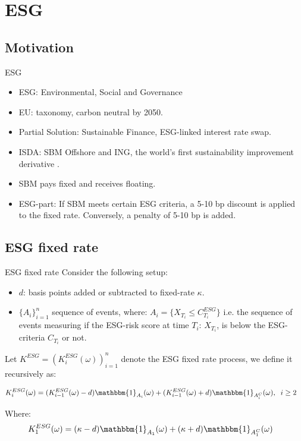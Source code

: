 \documentclass[UKenglish]{beamer}
\begin{document}
\section{ESG}
\SectionPage

\subsection{Motivation}
\begin{frame}{ESG}
\begin{itemize}
    \item ESG: Environmental, Social and Governance
    \item EU: taxonomy, carbon neutral by 2050.  
    \item Partial Solution: Sustainable Finance,
          ESG-linked interest rate swap. 
    \item ISDA: SBM Offshore and ING, the world's first sustainability improvement derivative
    \cite{ISDA_2021}. 
    \item SBM pays fixed and receives floating. 
    \item ESG-part: If SBM meets certain ESG criteria, a 5-10 bp discount is applied to the fixed rate. Conversely, a penalty of 5-10 bp is added.  
\end{itemize}
\end{frame}


\subsection{ESG fixed rate}

\begin{frame}{ESG fixed rate}
Consider the following setup: 
\begin{itemize}
    \item $d$: basis points added or subtracted to fixed-rate $\kappa$. 
    \item $\{A_{i}\}_{i=1}^{n}$ sequence of events, where: 
    $A_{i} = \{X_{T_{i}} \leq C_{T_{i}}^{ESG}\}$
    i.e. the sequence of events measuring if the ESG-risk score at time $T_{i}$: $X_{T_{i}}$, is below the ESG-criteria $C_{T_{i}}$ or not. 
\end{itemize}

\begin{definition}
Let $K^{ESG} = (K_{i}^{ESG}(\omega))_{i=1}^{n}$ 
denote the ESG fixed rate process, we define it recursively as: 

\begin{align*}
K_{i}^{ESG}(\omega) &= (K_{i-1}^{ESG}(\omega)-d)\mathbbm{1}_{A_{i}}(\omega)
+ (K_{i-1}^{ESG}(\omega)+d)\mathbbm{1}_{A_{i}^{C}}(\omega), \;\; i\geq 2
\end{align*}

Where:
\begin{align*}
K_{1}^{ESG}(\omega) &= (\kappa - d)\mathbbm{1}_{A_{1}}(\omega)
+ (\kappa + d)\mathbbm{1}_{A_{1}^{C}}(\omega)    
\end{align*}
\end{definition}

\end{frame}
\end{document}
